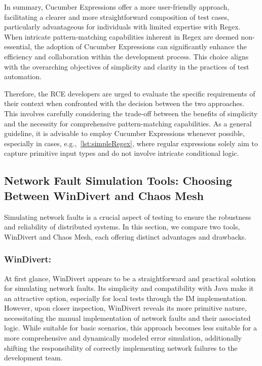 In summary, Cucumber Expressions offer a more user-friendly approach, facilitating a clearer and more straightforward composition of test cases, particularly advantageous for individuals with limited expertise with Regex. When intricate pattern-matching capabilities inherent in Regex are deemed non-essential, the adoption of Cucumber Expressions can significantly enhance the efficiency and collaboration within the development process. This choice aligns with the overarching objectives of simplicity and clarity in the practices of test automation.

Therefore, the RCE developers are urged to evaluate the specific requirements of their context when confronted with the decision between the two approaches. This involves carefully considering the trade-off between the benefits of simplicity and the necessity for comprehensive pattern-matching capabilities. As a general guideline, it is advisable to employ Cucumber Expressions whenever possible, especially in cases, e.g.,~\cref{lst:simpleRegex}, where regular expressions solely aim to capture primitive input types and do not involve intricate conditional logic.

\subsection{Network Fault Simulation Tools: Choosing Between WinDivert and Chaos Mesh}
\label{subsec:network-fault-wdiviert-chaos-mesh}
Simulating network faults is a crucial aspect of testing to ensure the robustness and reliability of distributed systems. In this section, we compare two tools, WinDivert and Chaos Mesh, each offering distinct advantages and drawbacks.

\subsubsection{WinDivert:}
At first glance, WinDivert appears to be a straightforward and practical solution for simulating network faults. Its simplicity and compatibility with Java make it an attractive option, especially for local tests through the \ac{IM} implementation. However, upon closer inspection, WinDivert reveals its more primitive nature, necessitating the manual implementation of network faults and their associated logic. While suitable for basic scenarios, this approach becomes less suitable for a more comprehensive and dynamically modeled error simulation, additionally shifting the responsibility of correctly implementing network failures to the development team.

